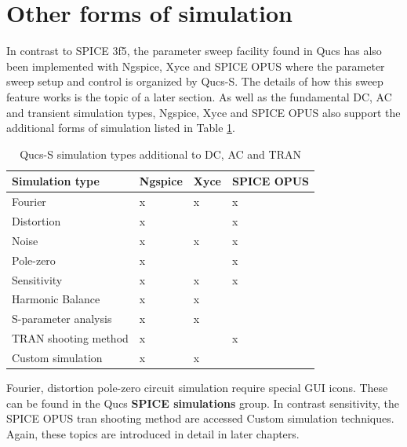 \documentclass[10pt, a4paper]{report}
\begin{document}
\section{Other forms of simulation}
In contrast to SPICE 3f5, the parameter sweep facility found in Qucs has also been implemented with Ngspice, Xyce and SPICE OPUS where the parameter sweep setup and control is organized by Qucs-S.  The details of how this sweep feature works is the topic of a later section. As well as the fundamental DC, AC and transient simulation types, Ngspice, Xyce and SPICE OPUS also support the additional forms of simulation listed in Table \ref{Table3}.
\begin{table} [h]
	\centering	
	\caption{Qucs-S  simulation types additional to DC, AC and TRAN}
	\label{Table3}
	\begin{tabular}  {|l|l|l|l|} \hline			
		\textbf{Simulation type} & \textbf{Ngspice} & \textbf{Xyce}   & \textbf{SPICE OPUS} \\  
		\hline   
		Fourier               &   x    &    x     &   x       \\
		Distortion            &   x    &          &   x       \\
		Noise                 &   x    &    x     &   x       \\
		Pole-zero             &   x    &          &   x       \\
		Sensitivity           &   x    &    x     &   x       \\
		Harmonic Balance      &   x    &    x     &           \\
		S-parameter analysis  &   x    &    x     &           \\	
		TRAN shooting method  &   x    &          &   x       \\
		Custom simulation     &   x    &    x     &           \\ 
		\hline
	\end{tabular}
\end{table}
\noindent Fourier, distortion pole-zero circuit simulation require special GUI icons. These can be found in the Qucs \textbf{SPICE simulations} group.  In contrast sensitivity, the SPICE OPUS tran shooting method are accessed Custom simulation techniques. Again, these topics are introduced in detail in later chapters. 
\end{document}
